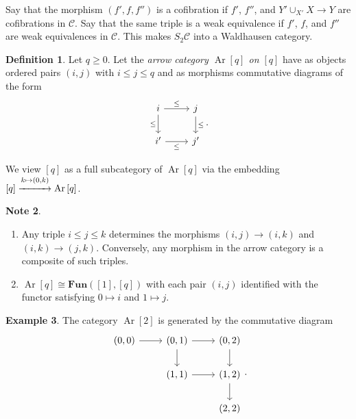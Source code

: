 \documentclass[10pt,letterpaper,cm]{nupset}
\theoremstyle{definition}
\newtheorem{definition}{Definition}
\newtheorem{exmp}[definition]{Example}
\newtheorem{note}[definition]{Note}
\theoremstyle{theorem}
\theoremstyle{remark}
\newcommand{\1}{\mathbf{1}}
\renewcommand{\c}{\mathscr{C}}
\newcommand{\0}{\vec 0}
\DeclareMathOperator{\Ar}{Ar}
\begin{document}
Say that the morphism $\left(f', f, f''\right)$ is a cofibration if $f'$, $f''$, and $Y' \cup_{X'} X \to Y$ are cofibrations in $\c$. Say that  the same triple is a weak equivalence if $f'$, $f$, and $f''$ are weak equivalences in $\c$. This makes $S_2 \c$ into a Waldhausen category.


\begin{definition}
Let $q\geq 0$. Let the \textit{arrow category $\Ar\left[q\right]$ on $\left[q\right]$} have as objects ordered pairs $\left(i, j\right)$ with $i\leq j \leq q$ and as morphisms commutative diagrams of the form
\[
\begin{tikzcd}
i \arrow[d, "\leq"'] \arrow[r, "\leq"] & j \arrow[d, "\leq"] \\
i' \arrow[r, "\leq"'] & j'
\end{tikzcd}.
\] 
\end{definition}

We view $\left[q\right]$ as a full subcategory of $\Ar\left[q\right]$ via the embedding $\left[q\right] \overset{k \mapsto \left(0, k\right)}{\xrightarrow{\hspace*{1cm}}} \Ar\left[q\right]$.

\begin{note} $ $
\begin{enumerate}
\item Any triple $i\leq j \leq k$ determines the morphisms $\left(i, j\right) \to \left(i, k\right)$ and $\left(i, k\right) \to \left(j, k\right)$. Conversely, any morphism in the arrow category is a composite of such triples.
\item $\Ar\left[q\right] \cong \mathbf{Fun}([1], \left[q\right])$ with each pair $\left(i, j\right)$ identified with the functor satisfying $0 \mapsto i$ and $1 \mapsto j$.
\end{enumerate}
\end{note}

\begin{exmp}
The category $\Ar[2]$ is generated by the commutative diagram
\[
\begin{tikzcd}
{\left(0, 0\right)} \arrow[r] & {\left(0,1\right)} \arrow[r] \arrow[d] & {\left(0,2\right)} \arrow[d] \\
 & {\left(1, 1\right)} \arrow[r] & {\left(1,2\right)} \arrow[d] \\
 &  & {\left(2,2\right)}
\end{tikzcd} .
\]
\end{exmp}

\smallskip
\end{document}
